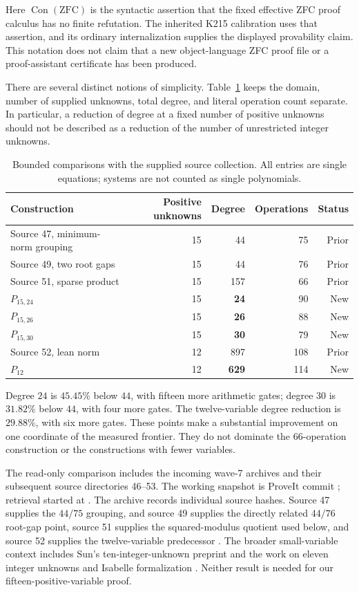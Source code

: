 \documentclass[11pt,a4paper]{article}
\theoremstyle{remark}
\newcommand{\Con}{\operatorname{Con}}
\newcommand{\ZFC}{\mathrm{ZFC}}
\newcommand{\Ptwo}{P_{15,24}}
\newcommand{\Pthree}{P_{15,26}}
\newcommand{\Pone}{P_{15,30}}
\begin{document}
Here $\Con(\ZFC)$ is the syntactic assertion that the fixed effective ZFC
proof calculus has no finite refutation. The inherited K215 calibration
uses that assertion, and its ordinary internalization supplies the displayed
provability claim. This notation does not claim that a new object-language
ZFC proof file or a proof-assistant certificate has been produced.

There are several distinct notions of simplicity. Table~\ref{tab:frontier}
keeps the domain, number of supplied unknowns, total degree, and literal
operation count separate. In particular, a reduction of degree at a fixed
number of positive unknowns should not be described as a reduction of the
number of unrestricted integer unknowns.

\begin{table}[htbp]
\centering
\small
\begin{tabular}{@{}lrrrr@{}}
\toprule
Construction & Positive unknowns & Degree & Operations & Status\\
\midrule
Source 47, minimum-norm grouping & 15 & 44 & 75 & Prior\\
Source 49, two root gaps & 15 & 44 & 76 & Prior\\
Source 51, sparse product & 15 & 157 & 66 & Prior\\
$\Ptwo$ & 15 & \textbf{24} & 90 & New\\
$\Pthree$ & 15 & \textbf{26} & 88 & New\\
$\Pone$ & 15 & \textbf{30} & 79 & New\\
Source 52, lean norm & 12 & 897 & 108 & Prior\\
$P_{12}$ & 12 & \textbf{629} & 114 & New\\
\bottomrule
\end{tabular}
\caption{Bounded comparisons with the supplied source collection. All entries
are single equations; systems are not counted as single polynomials.}
\label{tab:frontier}
\end{table}

Degree $24$ is $45.45\%$ below $44$, with fifteen more arithmetic gates;
degree $30$ is $31.82\%$ below $44$, with four more gates. The twelve-variable
degree reduction is $29.88\%$, with six more gates. These points make a
substantial improvement on one coordinate of the measured frontier. They
do not dominate the $66$-operation construction or the constructions with
fewer variables.

The read-only comparison includes the incoming wave-7 archives and their
subsequent source directories 46--53. The working snapshot is ProveIt
commit ; retrieval started
at . The archive records
individual source hashes. Source 47 supplies the $44/75$ grouping, and
source 49 supplies the directly related $44/76$ root-gap point,
source 51 supplies the squared-modulus quotient used below, and source 52
supplies the twelve-variable predecessor \cite{source47,source49,source51,source52}.
The broader small-variable context includes Sun's ten-integer-unknown
preprint and the work on eleven integer unknowns and Isabelle
formalization \cite{sun,bayer2026,bayer2025}. Neither result is needed for
our fifteen-positive-variable proof.
\end{document}
